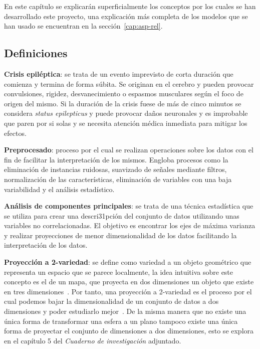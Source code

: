 
En este capítulo se explicarán superficialmente los conceptos por los cuales se han desarrollado este proyecto, una explicación más completa de los modelos que se han usado se encuentran en la sección~\ref{cap:asp-rel}.

\subsection{Definiciones}

\textbf{Crisis epiléptica}: se trata de un evento imprevisto de corta duración que comienza y termina de forma súbita. Se originan en el cerebro y pueden provocar convulsiones, rigidez, desvanecimiento o espasmos musculares según el foco de origen del mismo. Si la duración de la crisis fuese de más de cinco minutos se considera \textit{status epilepticus} y puede provocar daños neuronales y es improbable que paren por si solas y se necesita atención médica inmediata para mitigar los efectos.~\cite{epilepsia}

\textbf{Preprocesado}: proceso por el cual se realizan operaciones sobre los datos con el fin de facilitar la interpretación de los mismos. Engloba procesos como la eliminación de instancias ruidosas, suavizado de señales mediante filtros, normalización de las características, eliminación de variables con una baja variabilidad y el análisis estadístico.~\cite{ubu:mineria1}

\textbf{Análisis de componentes principales}: se trata de una técnica estadística que se utiliza para crear una descri31pción del conjunto de datos utilizando unas variables no correlacionadas. El objetivo es encontrar los ejes de máxima varianza y realizar proyecciones de menor dimensionalidad de los datos facilitando la interpretación de los datos.~\cite{wiki:pca}

\textbf{Proyección a 2-variedad}: se define como variedad a un objeto geométrico que representa un espacio que se parece localmente, la idea intuitiva sobre este concepto es el de un mapa, que proyecta en dos dimensiones un objeto que existe en tres dimensiones~\cite{wiki:manifold}. Por tanto, una proyección a 2-variedad es el proceso por el cual podemos bajar la dimensionalidad de un conjunto de datos a dos dimensiones y poder estudiarlo mejor~\cite{tool:scikit-learn}. De la misma manera que no existe una única forma de transformar una esfera a un plano tampoco existe una única forma de proyectar el conjunto de dimensiones a dos dimensiones, esto se explora en el capítulo 5 del \textit{Cuaderno de investigación} adjuntado.


